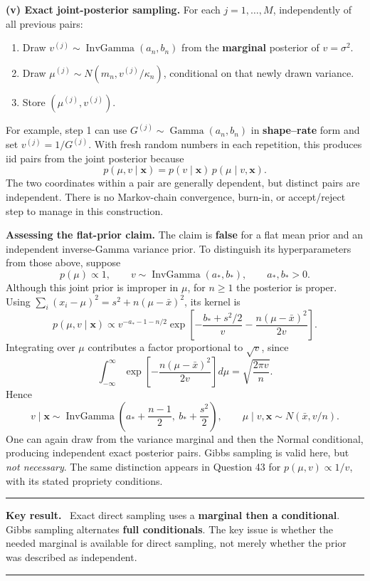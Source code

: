 \documentclass[11pt,a4paper]{article}
\newcommand{\given}{\mathrel{|}}
\newcommand{\xvec}{\boldsymbol{x}}
\DeclareMathOperator{\InvGamma}{InvGamma}
\newenvironment{keyresult}
  {\begin{center}\begin{minipage}{0.92\linewidth}\color{statblue}%
   \hrule\vspace{6pt}\textbf{Key result.}\ }
  {\vspace{6pt}\hrule\end{minipage}\end{center}}
\begin{document}
\textbf{(v) Exact joint-posterior sampling.}
For each $j=1,\ldots,M$, independently of all previous pairs:
\begin{enumerate}[label=\arabic*.]
  \item Draw $v^{(j)}\sim\InvGamma(a_n,b_n)$ from the \textbf{marginal}
        posterior of $v=\sigma^2$.
  \item Draw $\mu^{(j)}\sim N(m_n,v^{(j)}/\kappa_n)$, conditional on
        that newly drawn variance.
  \item Store $(\mu^{(j)},v^{(j)})$.
\end{enumerate}
For example, step 1 can use
$G^{(j)}\sim\operatorname{Gamma}(a_n,b_n)$ in \textbf{shape--rate}
form and set $v^{(j)}=1/G^{(j)}$.
With fresh random numbers in each repetition, this produces iid pairs
from the joint posterior because
\[
p(\mu,v\given\xvec)=p(v\given\xvec)\,p(\mu\given v,\xvec).
\]
The two coordinates within a pair are generally dependent, but distinct
pairs are independent. There is no Markov-chain convergence, burn-in,
or accept/reject step to manage in this construction.

\textbf{Assessing the flat-prior claim.}
The claim is \textbf{false} for a flat mean prior and an independent
inverse-Gamma variance prior. To distinguish its hyperparameters from
those above, suppose
\[
p(\mu)\propto1,\qquad
v\sim\InvGamma(a_*,b_*),\qquad a_*,b_*>0.
\]
Although this joint prior is improper in $\mu$, for $n\ge1$ the posterior
is proper. Using
$\sum_i(x_i-\mu)^2=s^2+n(\mu-\bar x)^2$, its kernel is
\[
p(\mu,v\given\xvec)
\propto v^{-a_*-1-n/2}
\exp\left[-\frac{b_*+s^2/2}{v}
          -\frac{n(\mu-\bar x)^2}{2v}\right].
\]
Integrating over $\mu$ contributes a factor proportional to $\sqrt v$,
since
\[
\int_{-\infty}^{\infty}
\exp\left[-\frac{n(\mu-\bar x)^2}{2v}\right]d\mu
=\sqrt{\frac{2\pi v}{n}}.
\]
Hence
\[
\boxed{v\given\xvec\sim
\InvGamma\!\left(a_*+\frac{n-1}{2},\ b_*+\frac{s^2}{2}\right),
\qquad\mu\given v,\xvec\sim N(\bar x,v/n).}
\]
One can again draw from the variance marginal and then the Normal
conditional, producing independent exact posterior pairs. Gibbs sampling
is valid here, but \emph{not necessary}. The same distinction appears in
Question 43 for $p(\mu,v)\propto1/v$, with its stated propriety conditions.

\begin{keyresult}
Exact direct sampling uses a \textbf{marginal then a conditional}.
Gibbs sampling alternates \textbf{full conditionals}. The key issue is
whether the needed marginal is available for direct sampling, not merely
whether the prior was described as independent.
\end{keyresult}
\end{document}
